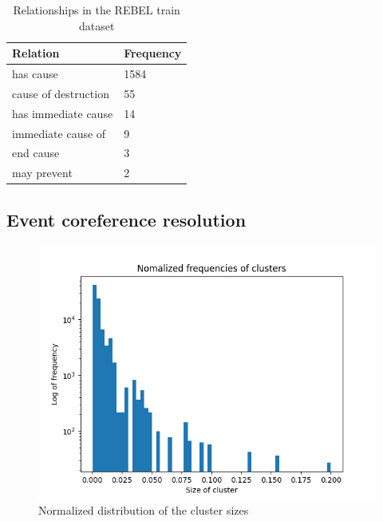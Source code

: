 \documentclass[
hf, %
]{ceurart}
\begin{document}
\begin{table}[!h]
\centering
\begin{tabular}{|l|l|}
\hline
\textbf{Relation}    & \textbf{Frequency} \\ \hline
has cause            & 1584               \\ \hline
cause of destruction & 55                 \\ \hline
has immediate cause  & 14                 \\ \hline
immediate cause of   & 9                  \\ \hline
end cause            & 3                  \\ \hline
may prevent          & 2                  \\ \hline
\end{tabular}
\caption{Relationships in the REBEL train dataset}
\label{apx:rebel_rel}
\end{table}

\subsection{Event coreference resolution}

\begin{figure}[!h]
    \centering
    \includegraphics[scale=0.5]{Images/norm_freq_cluster_size.png}
    \caption{Normalized distribution of the cluster sizes}
    \label{fig:norm_freq_cluster_size}
\end{figure}
\end{document}
